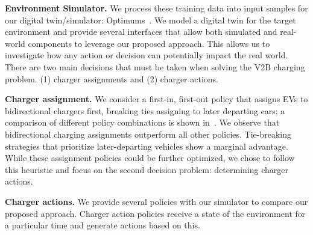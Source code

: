 \textbf{Environment Simulator.} We process these training data into input samples for our digital twin/simulator: Optimums~\cite{JP2024}. We model a digital twin for the target environment and provide several interfaces that allow both simulated and real-world components to leverage our proposed approach. This allows us to investigate how any action or decision can potentially impact the real world. 
There are two main decisions that must be taken when solving the V2B charging problem. (1) charger assignments and (2) charger actions.



\textbf{Charger assignment.} We consider a first-in, first-out policy that assigns EVs to bidirectional chargers first, breaking ties assigning to later departing cars; a comparison of different policy combinations is shown in~. We observe that bidirectional charging assignments outperform all other policies. Tie-breaking strategies that prioritize later-departing vehicles show a marginal advantage. While these assignment policies could be further optimized, we chose to follow this heuristic and focus on the second decision problem: determining charger actions.

\textbf{Charger actions.} We provide several policies with our simulator to compare our proposed approach. Charger action policies receive a state of the environment for a particular time and generate actions based on this. 




%  

%  
%  



